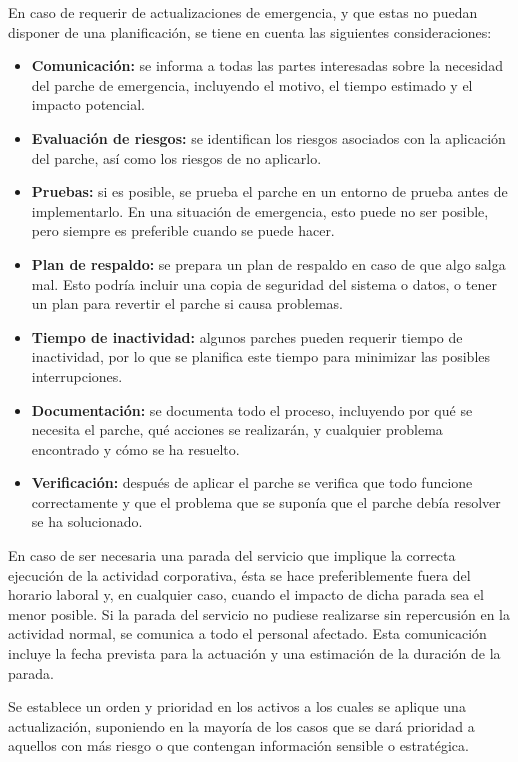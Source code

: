 \begin{enumerate}[label=\alph*)]
En caso de requerir de actualizaciones de emergencia, y que estas no puedan disponer de una planificación, se tiene en cuenta las siguientes consideraciones:

\begin{itemize}
    \item \textbf{Comunicación:} se informa a todas las partes interesadas sobre la necesidad del parche de emergencia, incluyendo el motivo, el tiempo estimado y el impacto potencial.
    \item \textbf{Evaluación de riesgos:} se identifican los riesgos asociados con la aplicación del parche, así como los riesgos de no aplicarlo.
    \item \textbf{Pruebas:} si es posible, se prueba el parche en un entorno de prueba antes de implementarlo. En una situación de emergencia, esto puede no ser posible, pero siempre es preferible cuando se puede hacer.
    \item \textbf{Plan de respaldo:} se prepara un plan de respaldo en caso de que algo salga mal. Esto podría incluir una copia de seguridad del sistema o datos, o tener un plan para revertir el parche si causa problemas.
    \item \textbf{Tiempo de inactividad:} algunos parches pueden requerir tiempo de inactividad, por lo que se planifica este tiempo para minimizar las posibles interrupciones.
    \item \textbf{Documentación:} se documenta todo el proceso, incluyendo por qué se necesita el parche, qué acciones se realizarán, y cualquier problema encontrado y cómo se ha resuelto.
    \item \textbf{Verificación:} después de aplicar el parche se verifica que todo funcione correctamente y que el problema que se suponía que el parche debía resolver se ha solucionado.
\end{itemize}

En caso de ser necesaria una parada del servicio que implique la correcta ejecución de la actividad corporativa, ésta se hace preferiblemente fuera del horario laboral y, en cualquier caso, cuando el impacto de dicha parada sea el menor posible. Si la parada del servicio no pudiese realizarse sin repercusión en la actividad normal, se comunica a todo el personal afectado. Esta comunicación incluye la fecha prevista para la actuación y una estimación de la duración de la parada.

Se establece un orden y prioridad en los activos a los cuales se aplique una actualización, suponiendo en la mayoría de los casos que se dará prioridad a aquellos con más riesgo o que contengan información sensible o estratégica.


\end{enumerate}
